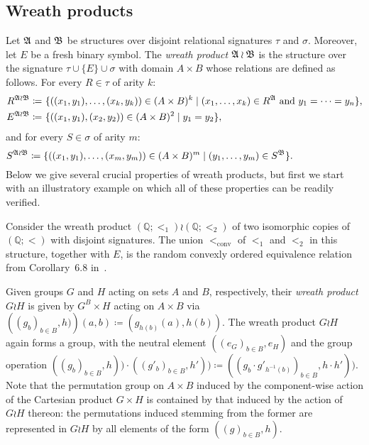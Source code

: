 \subsection{Wreath products}

Let $\mathfrak{A}$ and $\mathfrak{B}$ be structures over disjoint relational signatures $\tau$ and $\sigma$.
%
Moreover, let $E$ be a fresh binary symbol. 
%
The \emph{wreath product} $\mathfrak{A}\wr\mathfrak{B}$ is the structure over the signature $\tau\cup \{E\}\cup \sigma$ with domain $A\times B$ whose relations are defined as follows.
%
For every $R\in \tau$ of arity $k$:
%
\begin{align*}
    R^{\struct{A}\wr\struct{B}}    \coloneqq \ &  \{((x_1,y_1),\dots, (x_k,y_k))\in (A\times B)^k \mid (x_1,\dots, x_k)\in R^{\struct{A}}\text{ and } y_1=\cdots=y_n\}, \\
E^{\struct{A}\wr\struct{B}}\coloneqq \ &   \{((x_1,y_1),(x_2,y_2))\in (A\times B)^2 \mid y_1=y_2\},
\end{align*} 
%
and for every $S\in \sigma$ of arity $m$: 
%
\[
S^{\mathfrak{A}\wr\mathfrak{B}}  \mathrel{\mathop:}\mathrel{\mkern-1.2mu}=  \{((x_1,y_1),\dots, (x_m,y_m))\in (A\times B)^m \mid (y_1,\dots, y_m)\in S^{\mathfrak{B}}\}. \hspace{2.5cm}
\]
% 
 Below we give several crucial properties of wreath products, but first we start with an illustratory example on which all of these properties can be readily verified. 
%
\begin{example} \label{expl:running_example2}  
%
Consider the wreath product $(\mathbb{Q};<_1)\wr (\mathbb{Q};<_2)$ of two isomorphic copies of $(\mathbb{Q};<)$ with disjoint signatures. The union $<_{\text{conv}}$ of $<_1$ and $<_2$ in this structure, together with  $E$, is the random convexly ordered equivalence relation from Corollary~6.8 in~\cite{kechris2005fraisse}.
%
\end{example} 
%     
Given groups $G$ and $H$ acting on sets $A$ and $B$, respectively, their \emph{wreath product} $G\wr H$ is given by $G^B\times H$ acting on $A\times B$ via $\left((g_b)_{b\in B},h)\right)(a,b)\coloneqq (g_{h(b)}(a),h(b)).$
%
The wreath product $G\wr H$ again forms a group, with the neutral element 
$((e_G)_{b\in B},e_H)$ and the group operation 
$((g_b)_{b\in B},h))\cdot ((g'_b)_{b\in B},h'))\coloneqq ((g_b\cdot g'_{h^{-1}(b)})_{b\in B},h\cdot h'))$.
% 
Note that the permutation group on  $A\times B$ induced by the component-wise action of the Cartesian product $G\times H$ is contained by that induced by the action of $G\wr H$ thereon: the permutations induced stemming from the former are represented in $G\wr H$ by all elements of the form $((g)_{b\in B},h)$. 


